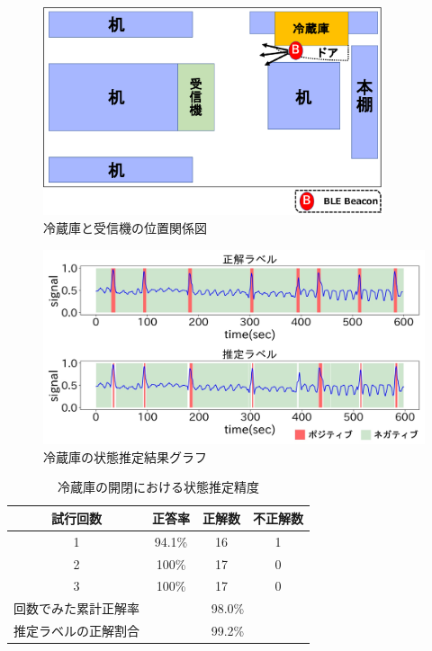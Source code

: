 \begin{figure}[tbh]
    \centering
    \includegraphics[width=10cm]{images/chapter3/refrigerator_position.pdf}
    \caption{冷蔵庫と受信機の位置関係図}
    \label{refrigerator_position}
\end{figure}


\begin{figure}[tbh]
    \centering
    \includegraphics[width=14cm]{images/chapter3/refrigerator_graph.jpg}
    \caption{冷蔵庫の状態推定結果グラフ}
    \label{refrigerator_graph}
\end{figure}


\begin{table}[tbh]
    \begin{center}
        \caption{冷蔵庫の開閉における状態推定精度}
        \label{refrigerator_fig}
        \begin{tabular}{|c|c|c|c|} \hline
        試行回数 & 正答率 & 正解数 & 不正解数 \\ \hline
        1 & 94.1\% & 16 & 1 \\ \hline
        2 & 100\% & 17 & 0 \\ \hline
        3 & 100\% & 17 & 0 \\ \hline \hline
        回数でみた累計正解率 & \multicolumn{3}{c|}{98.0\%} \\ \hline \hline
        推定ラベルの正解割合 & \multicolumn{3}{c|}{99.2\%} \\ \hline
        \end{tabular}
    \end{center}
\end{table}


